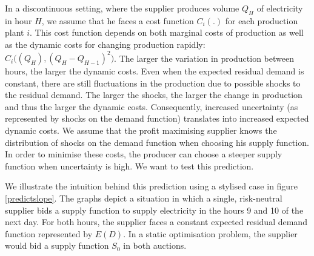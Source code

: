 In a discontinuous setting, where the supplier produces volume $Q_H$ of electricity in hour $H$, we assume that he faces a cost function $C_i(.)$ for each production plant $i$. This cost function depends on both marginal costs of production as well as the dynamic costs for changing production rapidly: $C_i \bigl( (Q_H), (Q_H - Q_{H-1})^2 \bigr)$. The larger the variation in production between hours, the larger the dynamic costs. 
Even when the expected residual demand is constant, there are still fluctuations in the production due to possible shocks to the residual demand. The larger the shocks, the larger the change in production and thus the larger the dynamic costs. 
Consequently, increased uncertainty (as represented by shocks on the demand function) translates into increased expected dynamic costs. We assume that the profit maximising supplier knows the distribution of shocks on the demand function when choosing his supply function.  In order to minimise these costs, the producer can choose a steeper supply function when uncertainty is high. We want to test this prediction. 

We illustrate the intuition behind this prediction using a stylised case in figure \ref{predictslope}. The graphs depict a situation in which a single, risk-neutral supplier bids a supply function to supply electricity in the hours 9 and 10 of the next day. For both hours, the supplier faces a constant expected residual demand function represented by $E(D)$. In a static optimisation problem, the supplier would bid a supply function $S_0$ in both auctions. 

